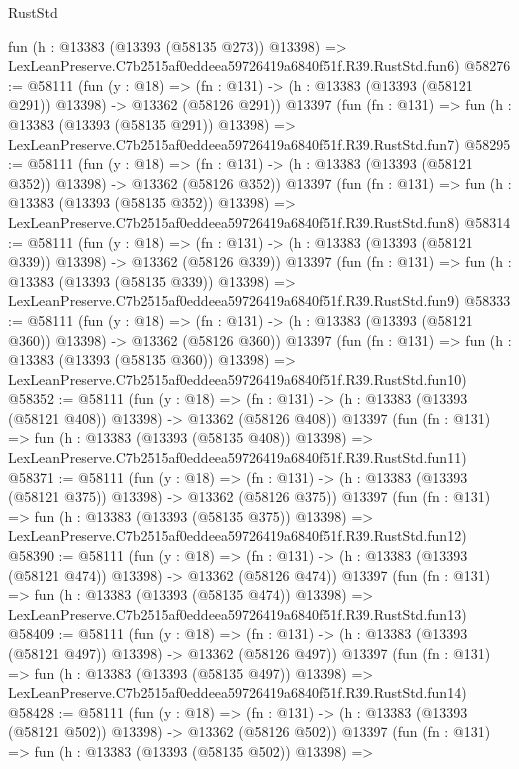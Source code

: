 \begin{lexlean}{RustStd}
\begin{coremodule}
    fun (h : @13383 (@13393 (@58135 @273)) @13398) =>
    LexLeanPreserve.C7b2515af0eddeea59726419a6840f51f.R39.RustStd.fun6)
@58276 := @58111
    (fun (y : @18) =>
    (fn : @131) -> (h : @13383 (@13393 (@58121 @291)) @13398) -> @13362 (@58126 @291))
    @13397
    (fun (fn : @131) =>
    fun (h : @13383 (@13393 (@58135 @291)) @13398) =>
    LexLeanPreserve.C7b2515af0eddeea59726419a6840f51f.R39.RustStd.fun7)
@58295 := @58111
    (fun (y : @18) =>
    (fn : @131) -> (h : @13383 (@13393 (@58121 @352)) @13398) -> @13362 (@58126 @352))
    @13397
    (fun (fn : @131) =>
    fun (h : @13383 (@13393 (@58135 @352)) @13398) =>
    LexLeanPreserve.C7b2515af0eddeea59726419a6840f51f.R39.RustStd.fun8)
@58314 := @58111
    (fun (y : @18) =>
    (fn : @131) -> (h : @13383 (@13393 (@58121 @339)) @13398) -> @13362 (@58126 @339))
    @13397
    (fun (fn : @131) =>
    fun (h : @13383 (@13393 (@58135 @339)) @13398) =>
    LexLeanPreserve.C7b2515af0eddeea59726419a6840f51f.R39.RustStd.fun9)
@58333 := @58111
    (fun (y : @18) =>
    (fn : @131) -> (h : @13383 (@13393 (@58121 @360)) @13398) -> @13362 (@58126 @360))
    @13397
    (fun (fn : @131) =>
    fun (h : @13383 (@13393 (@58135 @360)) @13398) =>
    LexLeanPreserve.C7b2515af0eddeea59726419a6840f51f.R39.RustStd.fun10)
@58352 := @58111
    (fun (y : @18) =>
    (fn : @131) -> (h : @13383 (@13393 (@58121 @408)) @13398) -> @13362 (@58126 @408))
    @13397
    (fun (fn : @131) =>
    fun (h : @13383 (@13393 (@58135 @408)) @13398) =>
    LexLeanPreserve.C7b2515af0eddeea59726419a6840f51f.R39.RustStd.fun11)
@58371 := @58111
    (fun (y : @18) =>
    (fn : @131) -> (h : @13383 (@13393 (@58121 @375)) @13398) -> @13362 (@58126 @375))
    @13397
    (fun (fn : @131) =>
    fun (h : @13383 (@13393 (@58135 @375)) @13398) =>
    LexLeanPreserve.C7b2515af0eddeea59726419a6840f51f.R39.RustStd.fun12)
@58390 := @58111
    (fun (y : @18) =>
    (fn : @131) -> (h : @13383 (@13393 (@58121 @474)) @13398) -> @13362 (@58126 @474))
    @13397
    (fun (fn : @131) =>
    fun (h : @13383 (@13393 (@58135 @474)) @13398) =>
    LexLeanPreserve.C7b2515af0eddeea59726419a6840f51f.R39.RustStd.fun13)
@58409 := @58111
    (fun (y : @18) =>
    (fn : @131) -> (h : @13383 (@13393 (@58121 @497)) @13398) -> @13362 (@58126 @497))
    @13397
    (fun (fn : @131) =>
    fun (h : @13383 (@13393 (@58135 @497)) @13398) =>
    LexLeanPreserve.C7b2515af0eddeea59726419a6840f51f.R39.RustStd.fun14)
@58428 := @58111
    (fun (y : @18) =>
    (fn : @131) -> (h : @13383 (@13393 (@58121 @502)) @13398) -> @13362 (@58126 @502))
    @13397
    (fun (fn : @131) =>
    fun (h : @13383 (@13393 (@58135 @502)) @13398) =>

\end{coremodule}
\end{lexlean}
